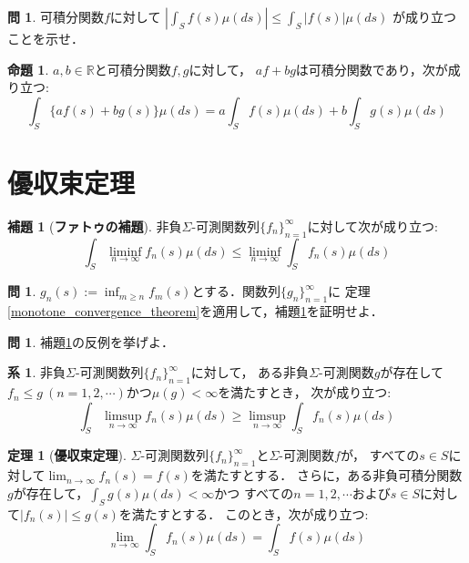 \documentclass{jsreport}
\theoremstyle{definition}
\newtheorem{lem}[defi]{補題}
\newtheorem{prop}[defi]{命題}
\newtheorem{thm}[defi]{定理}
\newtheorem{cor}[defi]{系}
\newtheorem{qst}[defi]{問}
\begin{document}
\begin{qst}\label{qst_absolute_integral_and_integral_absolute}
可積分関数$f$に対して
$\displaystyle\left|\int_Sf(s)\mu(ds)\right|\leq\int_S|f(s)|\mu(ds)$
が成り立つことを示せ．
\end{qst}

\begin{prop}\label{prop_linearity_of_integrable_function_integral}
$a,b\in\mathbb{R}$と可積分関数$f,g$に対して，
$af+bg$は可積分関数であり，次が成り立つ:
\[ \int_S\{af(s)+bg(s)\}\mu(ds)=a\int_Sf(s)\mu(ds)+b\int_Sg(s)\mu(ds) \]
\end{prop}

\section{優収束定理}

\begin{lem}[\textbf{ファトゥの補題}]\label{Fatou_lemma}
非負$\Sigma$-可測関数列$\{f_n\}_{n=1}^\infty$に対して次が成り立つ:
\[ \int_S\liminf_{n\to\infty}f_n(s)\mu(ds)\leq\liminf_{n\to\infty}\int_S f_n(s)\mu(ds) \]
\end{lem}

\begin{qst}\label{qst_proof_of_Fatou_lemma}
$g_n(s):=\displaystyle\inf_{m \geq n}f_m(s)$とする．関数列$\{g_n\}_{n=1}^\infty$に
定理\ref{monotone_convergence_theorem}を適用して，補題\ref{Fatou_lemma}を証明せよ．
\end{qst}

\begin{qst}\label{qst_counterexample_of_Fatou_lemma}
補題\ref{Fatou_lemma}の反例を挙げよ．
\end{qst}

\begin{cor}\label{reverse_Fatou_lemma}
非負$\Sigma$-可測関数列$\{f_n\}_{n=1}^\infty$に対して，
ある非負$\Sigma$-可測関数$g$が存在して
$f_n \leq g\ (n=1,2,\cdots)$かつ$\mu(g)<\infty$を満たすとき，
次が成り立つ:
\[ \int_S\limsup_{n\to\infty}f_n(s)\mu(ds)\geq\limsup_{n\to\infty}\int_S f_n(s)\mu(ds) \]
\end{cor}

\begin{thm}[\textbf{優収束定理}]\label{dominated_convergence_theorem}
$\Sigma$-可測関数列$\{f_n\}_{n=1}^\infty$と$\Sigma$-可測関数$f$が，
すべての$s \in S$に対して$\displaystyle\lim_{n\to\infty}f_n(s)=f(s)$を満たすとする．
さらに，ある非負可積分関数$g$が存在して，$\displaystyle\int_Sg(s)\mu(ds)<\infty$かつ
すべての$n=1,2,\cdots$および$s \in S$に対して$|f_n(s)| \leq g(s)$を満たすとする．
このとき，次が成り立つ:
\[ \lim_{n\to\infty}\int_Sf_n(s)\mu(ds)=\int_Sf(s)\mu(ds) \]
\end{thm}
\end{document}
